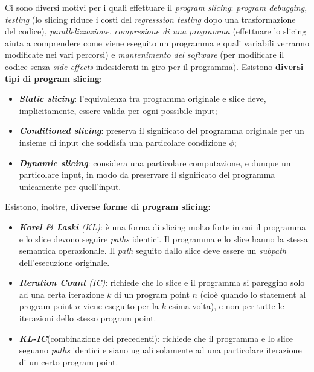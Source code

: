 \documentclass[a4paper, 10pt]{book}
\begin{document}
Ci sono diversi motivi per i quali effettuare il \textit{program slicing}: \textit{program debugging}, \textit{testing} (lo slicing riduce i costi del \textit{regresssion testing} dopo una trasformazione del codice), \textit{parallelizzazione},	\textit{compresione di una programma} (effettuare lo slicing aiuta a comprendere come viene eseguito un programma e quali variabili verranno modificate nei vari percorsi) e \textit{mantenimento del software} (per modificare il codice senza \textit{side effects} indesiderati in giro per il programma).
\newline
\newline
\noindent
Esistono \textbf{diversi tipi di program slicing}:
\begin{itemize}
	\item \textit{\textbf{Static slicing}}: l'equivalenza tra programma originale e slice deve, implicitamente, essere valida per ogni possibile input;
	\item \textit{\textbf{Conditioned slicing}}: preserva il significato del programma originale per un insieme di input che soddisfa una particolare condizione $\phi$;
	\item \textit{\textbf{Dynamic slicing}}: considera una particolare computazione, e dunque un particolare input, in modo da preservare il significato del programma unicamente per quell'input.
\end{itemize}

\noindent
Esistono, inoltre, \textbf{diverse forme di program slicing}:
\begin{itemize}
	\item \textit{\textbf{Korel \& Laski} (KL)}: è una forma di slicing molto forte in cui il programma e lo slice devono seguire \textit{paths} identici. Il programma e lo slice hanno la stessa semantica operazionale. Il \textit{path} seguito dallo slice deve essere un \textit{subpath} dell'esecuzione originale.
	\item \textit{\textbf{Iteration Count} (IC)}: richiede che lo slice e il programma si pareggino solo ad una certa iterazione $k$ di un program point $n$ (cioè quando lo statement al program point $n$ viene eseguito per la $k$-esima volta), e non per tutte le iterazioni dello stesso program point.
	\item \textit{\textbf{KL-IC}}(combinazione dei precedenti): richiede che il programma e lo slice seguano \textit{paths} identici e siano uguali solamente ad una particolare iterazione di un certo program point.
\end{itemize}
	
	
	
	
	
	
	
	
	
	
	
\end{document}
